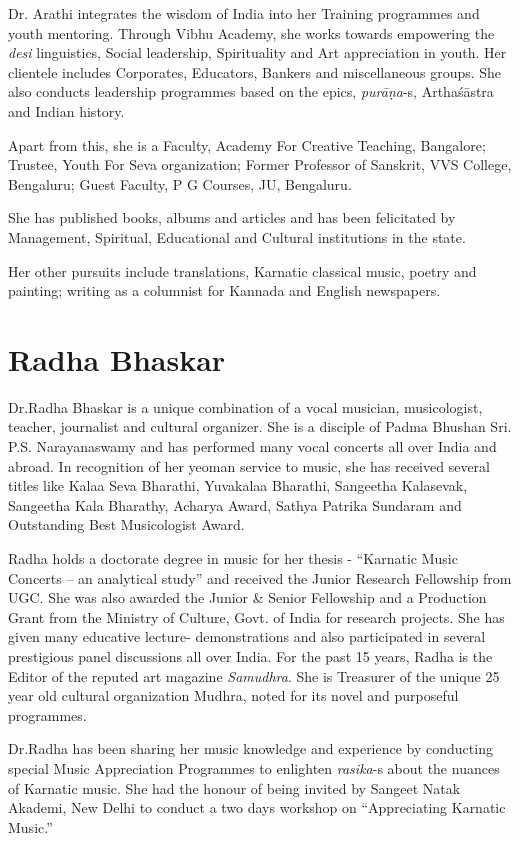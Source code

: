 Dr. Arathi integrates the wisdom of India into her Training programmes and youth mentoring. Through Vibhu Academy, she works towards empowering the \textit{desi} linguistics, Social leadership, Spirituality and Art appreciation in youth. Her clientele includes Corporates, Educators, Bankers and miscellaneous groups. She also conducts leadership programmes based on the epics, \textit{purāṇa}-s, Arthaśāstra and Indian history.

Apart from this, she is a Faculty, Academy For Creative Teaching, Bangalore; Trustee, Youth For Seva organization; Former Professor of Sanskrit, VVS College, Bengaluru; Guest Faculty, P G Courses, JU, Bengaluru.

She has published books, albums and articles and has been felicitated by Management, Spiritual, Educational and Cultural institutions in the state.

Her other pursuits include translations, Karnatic classical music, poetry and painting; writing as a columnist for Kannada and English newspapers.


\section*{Radha Bhaskar}

Dr.Radha Bhaskar is a unique combination of a vocal musician, musicologist, teacher, journalist and cultural organizer. She is a disciple of Padma Bhushan Sri. P.S. Narayanaswamy and has performed many vocal concerts all over India and abroad. In recognition of her yeoman service to music, she has received several titles like Kalaa Seva Bharathi, Yuvakalaa Bharathi, Sangeetha Kalasevak, Sangeetha Kala Bharathy, Acharya Award, Sathya Patrika Sundaram and Outstanding Best Musicologist Award.

Radha holds a doctorate degree in music for her thesis - “Karnatic Music Concerts – an analytical study” and received the Junior Research Fellowship from UGC. She was also awarded the Junior \& Senior Fellowship and a Production Grant from the Ministry of Culture, Govt. of India for research projects. She has given many educative lecture- demonstrations and also participated in several prestigious panel discussions all over India. For the past 15 years, Radha is the Editor of the reputed art magazine \textit{Samudhra}. She is Treasurer of the unique 25 year old cultural organization Mudhra, noted for its novel and purposeful programmes.

Dr.Radha has been sharing her music knowledge and experience by conducting special Music Appreciation Programmes to enlighten \textit{rasika}-s about the nuances of Karnatic music. She had the honour of being invited by Sangeet Natak Akademi, New Delhi to conduct a two days workshop on “Appreciating Karnatic Music.”


